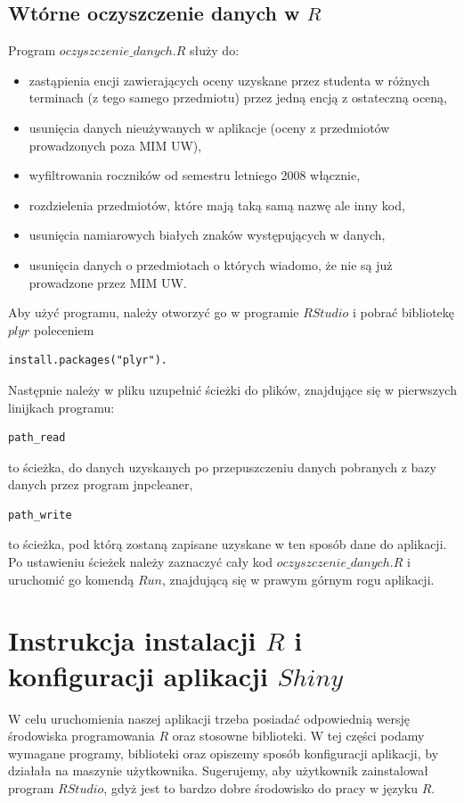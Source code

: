 \documentclass[]{article}
\begin{document}
\subsection*{Wtórne oczyszczenie danych w $R$}

Program $oczyszczenie\_danych.R$ służy do:
\begin{itemize}
	\item zastąpienia encji zawierających oceny uzyskane przez studenta w różnych terminach (z tego samego przedmiotu) przez jedną encją z ostateczną oceną,
	\item usunięcia danych nieużywanych w aplikacje (oceny z przedmiotów prowadzonych poza MIM UW),
	\item wyfiltrowania roczników od semestru letniego 2008 włącznie,
	\item rozdzielenia przedmiotów, które mają taką samą nazwę ale inny kod,
	\item usunięcia namiarowych białych znaków występujących w danych,
	\item usunięcia danych o przedmiotach o których wiadomo, że nie są już prowadzone przez MIM UW.
\end{itemize}
Aby użyć programu, należy otworzyć go w programie $RStudio$ i pobrać bibliotekę $plyr$ poleceniem 
\begin{verbatim}
install.packages("plyr").
\end{verbatim} 
Następnie należy w pliku uzupełnić ścieżki do plików, znajdujące się w pierwszych linijkach programu: 
\begin{verbatim}
path_read
\end{verbatim}
to ścieżka, do danych uzyskanych po przepuszczeniu danych pobranych z bazy danych przez program jnpcleaner,
\begin{verbatim}
path_write
\end{verbatim}
to ścieżka, pod którą zostaną zapisane uzyskane w ten sposób dane do aplikacji. Po ustawieniu ścieżek należy zaznaczyć cały kod $oczyszczenie\_danych.R$ i uruchomić go komendą $Run$, znajdującą się w prawym górnym rogu aplikacji.


\section{Instrukcja instalacji $R$ i konfiguracji aplikacji $Shiny$}
W celu uruchomienia naszej aplikacji trzeba posiadać odpowiednią wersję środowiska programowania $R$ oraz stosowne biblioteki. W tej części podamy wymagane programy, biblioteki oraz opiszemy sposób konfiguracji aplikacji, by działała na maszynie użytkownika. Sugerujemy, aby użytkownik zainstalował program $RStudio$, gdyż jest to bardzo dobre środowisko do pracy w języku $R$.
\end{document}
